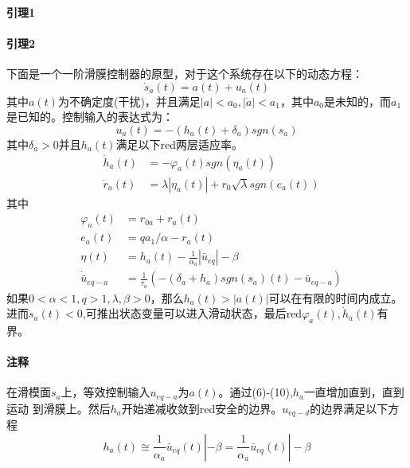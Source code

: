 \documentclass{cjc}
\begin{document}
    \paragraph{引理1}

    \paragraph{引理2}
    下面是一个一阶滑膜控制器的原型，对于这个系统存在以下的动态方程：
    \begin{equation}
      \dot{s}_a(t) = a(t) + u_a(t)
    \end{equation}  
    其中$a(t)$为不确定度(干扰)，并且满足$|a|<a_0,|\dot{a}|<a_1$，其中$a_0$是未知的，而$a_1$
    是已知的。控制输入的表达式为：
    \begin{equation}
      u_a(t) = -(h_a(t) +\delta _a)sgn(s_a)
    \end{equation}
    其中$\delta _a> 0 $并且$h_a(t)$满足以下{{red}两层适应率}。
    \begin{eqnarray}
      &\dot{h}_a(t) &= - \varphi_a (t) sgn(\eta  _a(t))  \\
      &\dot{r}_a(t) &= \lambda  |\eta_a (t)| + r_0 \sqrt{\lambda  }sgn(e_a(t))
    \end{eqnarray}
    其中\:
    \begin{eqnarray}  
      &\varphi_a (t) &= r_{0a} + r_a(t) \\
      &e_a(t)& = q a_1/\alpha  - r_a(t) \\
      &\eta  (t) &= h_a(t) - \frac{1}{\alpha_a}|\bar{u}_{eq}| - \beta \\
      &\dot{\bar{u}}_{eq-a} &= \frac{1}{\tau _a}(-(\delta_a + h_a )sgn(s_a)(t)-\bar{u}_{eq-a})
    \end{eqnarray}
    如果$0<\alpha <1,q>1,\lambda ,\beta >0$，那么$h_a(t)>|a(t)|$可以在有限的时间内成立。
    进而$\dot{s}_a(t)<0$,可推出状态变量可以进入滑动状态，最后{{red}$\varphi_a (t),\dot{h}_a(t)$有界}。
    
    \paragraph{注释}
    在滑模面$s_a$上，等效控制输入$u_{eq-a}$为$a(t)$。通过(6)-(10),$h_a$一直增加直到，直到运动
    到滑膜上。然后$h_a$开始递减收敛到{{red}安全的边界}。$u_{eq-d}$的边界满足以下方程\:
    \begin{equation}
      h_a(t) \cong \frac{1}{\alpha _a}\bar{u}_{eq}(t)| -\beta 
      =\frac{1}{\alpha _a}\bar{u}_{eq}(t)| -\beta
    \end{equation}
    
\end{document}
